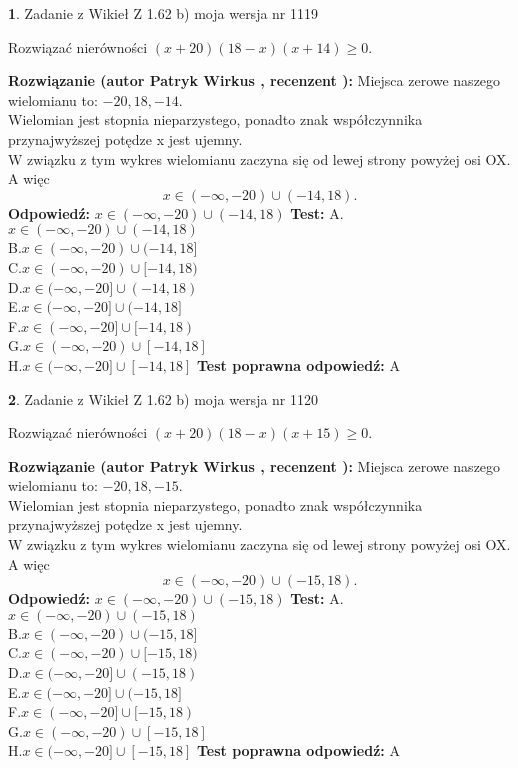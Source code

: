 \documentclass[12pt, a4paper]{article}
\theoremstyle{definition} %
\newtheorem{zad}{}
\newcommand{\zadStart}[1]{\begin{zad}#1\newline}
\newcommand{\zadStop}{\end{zad}}
\newcommand{\rozwStart}[2]{\noindent \textbf{Rozwiązanie (autor #1 , recenzent #2): }\newline}
\newcommand{\rozwStop}{\newline}
\newcommand{\odpStart}{\noindent \textbf{Odpowiedź:}\newline}
\newcommand{\odpStop}{\newline}
\newcommand{\testStart}{\noindent \textbf{Test:}\newline}
\newcommand{\testStop}{\newline}
\newcommand{\kluczStart}{\noindent \textbf{Test poprawna odpowiedź:}\newline}
\newcommand{\kluczStop}{\newline}
\begin{document}
\zadStart{Zadanie z Wikieł Z 1.62 b) moja wersja nr 1119}

Rozwiązać nierówności $(x+20)(18-x)(x+14)\ge0$.
\zadStop
\rozwStart{Patryk Wirkus}{}
Miejsca zerowe naszego wielomianu to: $-20, 18, -14$.\\
Wielomian jest stopnia nieparzystego, ponadto znak współczynnika przy\linebreak najwyższej potędze x jest ujemny.\\ W związku z tym wykres wielomianu zaczyna się od lewej strony powyżej osi OX. A więc $$x \in (-\infty,-20) \cup (-14,18).$$
\rozwStop
\odpStart
$x \in (-\infty,-20) \cup (-14,18)$
\odpStop
\testStart
A.$x \in (-\infty,-20) \cup (-14,18)$\\
B.$x \in (-\infty,-20) \cup (-14,18]$\\
C.$x \in (-\infty,-20) \cup [-14,18)$\\
D.$x \in (-\infty,-20] \cup (-14,18)$\\
E.$x \in (-\infty,-20] \cup (-14,18]$\\
F.$x \in (-\infty,-20] \cup [-14,18)$\\
G.$x \in (-\infty,-20) \cup [-14,18]$\\
H.$x \in (-\infty,-20] \cup [-14,18]$
\testStop
\kluczStart
A
\kluczStop



\zadStart{Zadanie z Wikieł Z 1.62 b) moja wersja nr 1120}

Rozwiązać nierówności $(x+20)(18-x)(x+15)\ge0$.
\zadStop
\rozwStart{Patryk Wirkus}{}
Miejsca zerowe naszego wielomianu to: $-20, 18, -15$.\\
Wielomian jest stopnia nieparzystego, ponadto znak współczynnika przy\linebreak najwyższej potędze x jest ujemny.\\ W związku z tym wykres wielomianu zaczyna się od lewej strony powyżej osi OX. A więc $$x \in (-\infty,-20) \cup (-15,18).$$
\rozwStop
\odpStart
$x \in (-\infty,-20) \cup (-15,18)$
\odpStop
\testStart
A.$x \in (-\infty,-20) \cup (-15,18)$\\
B.$x \in (-\infty,-20) \cup (-15,18]$\\
C.$x \in (-\infty,-20) \cup [-15,18)$\\
D.$x \in (-\infty,-20] \cup (-15,18)$\\
E.$x \in (-\infty,-20] \cup (-15,18]$\\
F.$x \in (-\infty,-20] \cup [-15,18)$\\
G.$x \in (-\infty,-20) \cup [-15,18]$\\
H.$x \in (-\infty,-20] \cup [-15,18]$
\testStop
\kluczStart
A
\kluczStop
\end{document}
